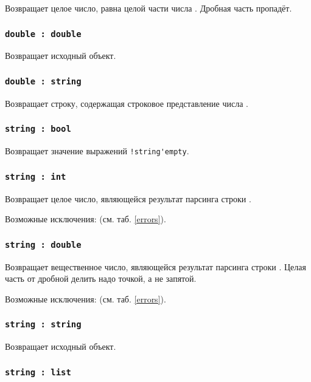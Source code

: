 Возвращает целое число, равна целой части числа \double. Дробная часть пропадёт.

\subsubsection{\lstinline|double : double|}

Возвращает исходный объект.

\subsubsection{\lstinline|double : string|}

Возвращает строку, содержащая строковое представление числа \double.

\subsubsection{\lstinline|string : bool|}

Возвращает значение выражений \lstinline|!string'empty|.

\subsubsection{\lstinline|string : int|}

Возвращает целое число, являющейся результат парсинга строки \str.

Возможные исключения:  (см. таб. \ref{errors}).

\subsubsection{\lstinline|string : double|}

Возвращает вещественное число, являющейся результат парсинга строки \str. Целая часть от дробной делить надо точкой, а не запятой.

Возможные исключения:  (см. таб. \ref{errors}).

\subsubsection{\lstinline|string : string|}

Возвращает исходный объект.

\subsubsection{\lstinline|string : list|}

